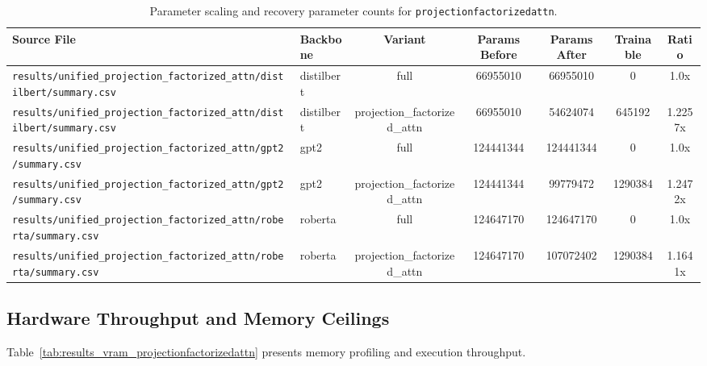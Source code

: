 \begin{table}[t]
\centering
\small
\begin{tabular}{llccccc}
\toprule
\textbf{Source File} & \textbf{Backbone} & \textbf{Variant} & \textbf{Params Before} & \textbf{Params After} & \textbf{Trainable} & \textbf{Ratio} \\
\midrule
\texttt{results/unified\_projection\_factorized\_attn/distilbert/summary.csv} & distilbert & full & 66955010 & 66955010 & 0 & 1.0x \\
\texttt{results/unified\_projection\_factorized\_attn/distilbert/summary.csv} & distilbert & projection\_factorized\_attn & 66955010 & 54624074 & 645192 & 1.2257x \\
\texttt{results/unified\_projection\_factorized\_attn/gpt2/summary.csv} & gpt2 & full & 124441344 & 124441344 & 0 & 1.0x \\
\texttt{results/unified\_projection\_factorized\_attn/gpt2/summary.csv} & gpt2 & projection\_factorized\_attn & 124441344 & 99779472 & 1290384 & 1.2472x \\
\texttt{results/unified\_projection\_factorized\_attn/roberta/summary.csv} & roberta & full & 124647170 & 124647170 & 0 & 1.0x \\
\texttt{results/unified\_projection\_factorized\_attn/roberta/summary.csv} & roberta & projection\_factorized\_attn & 124647170 & 107072402 & 1290384 & 1.1641x \\
\bottomrule
\end{tabular}
\caption{Parameter scaling and recovery parameter counts for \texttt{projectionfactorizedattn}.}
\label{tab:results_params_projectionfactorizedattn}
\end{table}

\subsection{Hardware Throughput and Memory Ceilings}
Table~\ref{tab:results_vram_projectionfactorizedattn} presents memory profiling and execution throughput.

